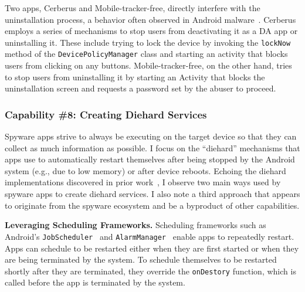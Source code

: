 Two apps, Cerberus and Mobile-tracker-free, directly interfere with the
uninstallation process, a behavior often observed in Android
malware~\cite{shan2019device,aljarrah2016maintaining}. Cerberus employs a series
of mechanisms to stop users from deactivating it as a DA app or
uninstalling it. These include trying to lock the device by invoking the
\texttt{lockNow} method of the \texttt{DevicePolicyManager} class and starting
an activity that blocks users from clicking on any buttons. Mobile-tracker-free,
on the other hand, tries to stop users from uninstalling it by starting an
Activity that blocks the uninstallation screen and requests a password set
by the abuser to proceed.

\subsubsection*{Capability \#8: Creating Diehard Services}
%
Spyware apps strive to always be executing on the target device so
that they can collect as much information as possible.  I focus on
the ``diehard'' mechanisms that apps use to automatically restart
themselves after being stopped by the Android system (e.g., due to low memory) or after device
reboots. Echoing the diehard implementations discovered in prior
work~\cite{shao2019lightweight,zhou2020demystifying}, I observe two
main ways used by spyware apps to create diehard services. I also note
a third approach that appears to originate from the spyware ecosystem
and be a byproduct of other capabilities.

\textbf{Leveraging Scheduling Frameworks.} Scheduling frameworks such as Android's
\texttt{JobScheduler}~\cite{JobSched94:online} and
\texttt{AlarmManager}~\cite{AlarmMan39:online} enable apps to repeatedly
restart. Apps can schedule to be restarted either when they are
first started or when they are being terminated by the system. To schedule
themselves to be restarted shortly after they are terminated, they override the
\texttt{onDestory} function, which is called before the app is terminated by the
system.


